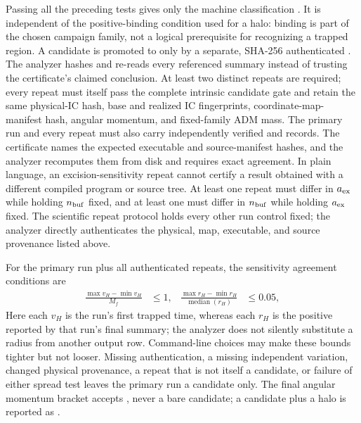 Passing all the preceding tests gives only the machine classification
.  It is independent of the positive-binding
condition used for a halo: binding is part of the chosen campaign family, not
a logical prerequisite for recognizing a trapped region.  A candidate is
promoted to  only by a separate, SHA-256
authenticated
.  The analyzer hashes
and re-reads every referenced summary instead of trusting the certificate's
claimed conclusion.  At least two distinct repeats are required; every repeat
must itself pass the complete intrinsic candidate gate and retain the same
physical-IC hash, base and realized IC fingerprints, coordinate-map-manifest
hash, angular momentum, and fixed-family ADM mass.  The primary run and every
repeat must also carry independently verified  and
 records.  The certificate names the expected executable
and source-manifest hashes, and the analyzer recomputes them from disk and
requires exact agreement.  In plain language, an excision-sensitivity repeat
cannot certify a result obtained with a different compiled program or source
tree.  At least one repeat must
differ in \(a_{\rm ex}\) while holding \(n_{\rm buf}\) fixed, and at least
one must differ in \(n_{\rm buf}\) while holding \(a_{\rm ex}\) fixed.  The
scientific repeat protocol holds every other run control fixed; the analyzer
directly authenticates the physical, map, executable, and source provenance
listed above.

For the primary run plus all authenticated repeats, the sensitivity agreement
conditions are
\begin{align}
 \frac{\max v_H-\min v_H}{M_f}&\le1,&
 \frac{\max r_H-\min r_H}{\operatorname{median}(r_H)}&\le0.05,
                                                               \tag{IEF57j}
\end{align}
Here each \(v_H\) is the run's first trapped time, whereas each \(r_H\) is the
positive  reported by that run's final summary;
the analyzer does not silently substitute a radius from another output row.
Command-line choices may make these bounds tighter but not looser.  Missing
authentication, a missing independent
variation, changed physical provenance, a repeat that is not itself a
candidate, or failure of either spread test leaves the primary run a candidate
only.  The final angular momentum bracket accepts
, never a bare candidate; a candidate plus a halo
is reported as
.

